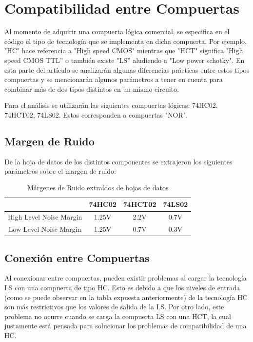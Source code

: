 \section{Compatibilidad entre Compuertas}

Al momento de adquirir una compuerta lógica comercial, se especifica
en el código el tipo de tecnología que se implementa en dicha compuerta.
Por ejemplo, "HC" hace referencia a "High speed CMOS" mientras
que "HCT" significa "High speed CMOS TTL''   o también existe
"LS'' aludiendo a "Low power schotky". En esta parte del artículo
se analizarán algunas diferencias prácticas entre estos tipos compuertas
y se mencionarán algunos parámetros a tener en cuenta para combinar
más de dos tipos distintos en un mismo circuito.

Para el análisis se utilizarán las siguientes compuertas lógicas:
74HC02, 74HCT02, 74LS02. Estas corresponden a compuertas "NOR".

\subsection{Margen de Ruido}

De la hoja de datos de los distintos componentes se extrajeron los
siguientes parámetros sobre el margen de ruido:

\begin{table}[H]
    \centering
\begin{tabular}{|c|c|c|c|}
\hline 
 & 74HC02 & 74HCT02 & 74LS02\tabularnewline
\hline 
High Level Noise Margin & 1.25V & 2.2V & 0.7V\tabularnewline
\hline 
Low Level Noise Margin & 1.25V & 0.7V & 0.3V\tabularnewline
\hline 
\end{tabular}

\caption{Márgenes de Ruido extraídos de hojas de datos}
\end{table}


\subsection{Conexión entre Compuertas}

Al conexionar entre compuertas, pueden existir problemas al cargar
la tecnología LS con una compuerta de tipo HC. Esto es debido a que
los niveles de entrada (como se puede observar en la tabla expuesta
anteriormente) de la tecnología HC son más restrictivos que los valores
de salida de la LS. Por otro lado, este problema no ocurre cuando
se carga la compuerta LS con una HCT, la cual justamente está pensada
para solucionar los problemas de compatibilidad de una HC.

